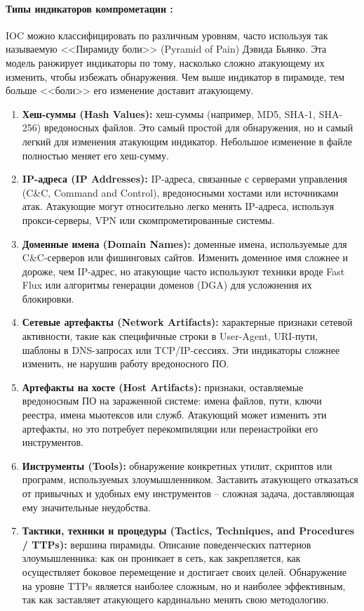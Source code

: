 \paragraph*{Типы индикаторов компрометации \cite{IDSBranitsky}:} IOC можно классифицировать по различным уровням, часто используя так называемую <<Пирамиду боли>> (Pyramid of Pain) Дэвида Бьянко. Эта модель ранжирует индикаторы по тому, насколько сложно атакующему их изменить, чтобы избежать обнаружения. Чем выше индикатор в пирамиде, тем больше <<боли>> его изменение доставит атакующему.
\begin{enumerate}
    \item \textbf{Хеш-суммы (Hash Values):} хеш-суммы (например, MD5, SHA-1, SHA-256) вредоносных файлов. Это самый простой для обнаружения, но и самый легкий для изменения атакующим индикатор. Небольшое изменение в файле полностью меняет его хеш-сумму.  
    \item \textbf{IP-адреса (IP Addresses):} IP-адреса, связанные с серверами управления (C\&C, Command and Control), вредоносными хостами или источниками атак. Атакующие могут относительно легко менять IP-адреса, используя прокси-серверы, VPN или скомпрометированные системы.
    \item \textbf{Доменные имена (Domain Names):} доменные имена, используемые для C\&C-серверов или фишинговых сайтов. Изменить доменное имя сложнее и дороже, чем IP-адрес, но атакующие часто используют техники вроде Fast Flux или алгоритмы генерации доменов (DGA) для усложнения их блокировки.
    \item \textbf{Сетевые артефакты (Network Artifacts):} характерные признаки сетевой активности, такие как специфичные строки в User-Agent, URI-пути, шаблоны в DNS-запросах или TCP/IP-сессиях. Эти индикаторы сложнее изменить, не нарушив работу вредоносного ПО.
    \item \textbf{Артефакты на хосте (Host Artifacts):} признаки, оставляемые вредоносным ПО на зараженной системе: имена файлов, пути, ключи реестра, имена мьютексов или служб. Атакующий может изменить эти артефакты, но это потребует перекомпиляции или перенастройки его инструментов.
    \item \textbf{Инструменты (Tools):} обнаружение конкретных утилит, скриптов или программ, используемых злоумышленником. Заставить атакующего отказаться от привычных и удобных ему инструментов -- сложная задача, доставляющая ему значительные неудобства.
    \item \textbf{Тактики, техники и процедуры (Tactics, Techniques, and Procedures / TTPs):} вершина пирамиды. Описание поведенческих паттернов злоумышленника: как он проникает в сеть, как закрепляется, как осуществляет боковое перемещение и достигает своих целей. Обнаружение на уровне TTPs является наиболее сложным, но и наиболее эффективным, так как заставляет атакующего кардинально менять свою методологию.
\end{enumerate}

